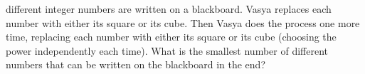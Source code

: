  different integer numbers are written on a blackboard.
Vasya replaces each number with either its square or its cube.
Then Vasya does the process one more time, replacing each number with either
its square or its cube (choosing the power independently each time).
What is the smallest number of different numbers that can be written
on the blackboard in the end?
\solution
\endproblem
